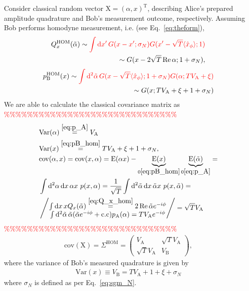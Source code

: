 \documentclass[%
reprint,
superscriptaddress,
 amsmath,amssymb,amsfonts,
 aps,
 pra,
 longbibliography
]{revtex4-2}
\newcommand{\avr}[1]{\ensuremath{\langle{#1}\rangle}}
\renewcommand{\Re}{\mathop{\rm Re}\nolimits}
\newcommand{\ind}[1]{\mathrm{#1}}
\newcommand{\dd}{\mathrm{d}}
\begin{document}
Consider classical random vector $\boldsymbol{\ind{X}}=\left(\alpha, x\right)^{\ind{T}}$, describing Alice's prepared amplitude quadrature and Bob's measurement outcome, respectively.
Assuming Bob performs homodyne measurement, i.e. (see Eq.~\eqref{eq:theform}),
\begin{align}
  \label{eq:Q_x_hom}
  Q_x^{\ind{HOM}}(\tilde{\alpha})\sim\textcolor{red}{\int\mathop{\dd x'} G(x-x';\sigma_N)G(x'-\sqrt T\avr{\hat{x}_\phi};1)}\notag\\\sim G(x-2\sqrt T\Re\alpha; 1+\sigma_N),
\end{align}
\begin{align}
  \label{eq:pB_hom}
  p_{\ind{B}}^{\ind{HOM}}(x)\sim\textcolor{red}{
    \int \mathop{\dd^2\tilde \alpha} G(x-\sqrt T\avr{\hat{x}_\phi}; 1+\sigma_N)G(\alpha;TV_{\ind{A}}+\xi)
  }\notag\\\sim G(x;TV_{\ind{A}}+\xi+1+\sigma_N)
\end{align}
We are able to calculate the classical covariance matrix as
\textcolor{red}{\%\%\%\%\%\%\%\%\%\%\%\%\%\%\%\%\%\%\%\%\%\%\%\%\%\%\%\%\%\%}
\begin{align}
  &\ind{Var}(\alpha)\overset{\eqref{eq:p_A}}{=}V_{\ind{A}}\\
  &\ind{Var}(x)\overset{\eqref{eq:pB_hom}}{=} TV_{\ind{A}}+\xi+1+\sigma_N,\\
  &\ind{cov}(\alpha,x)=\ind{cov}(x,\alpha)=\ind{E}(\alpha x)- \underbrace{\ind{E}(x)}_{0\eqref{eq:pB_hom}}\underbrace{\ind{E}(\tilde\alpha)}_{0\eqref{eq:p_A}}=\notag\\
  &\int\mathop{\dd^2\alpha}\mathop{\dd x}\alpha x\ p(x,\alpha)=
  \frac{1}{\sqrt{T}}\int\mathop{\dd^2\tilde\alpha}\mathop{\dd x}\tilde\alpha x\ p(x,\tilde\alpha)=\notag\\
  &\left/
  \begin{matrix}
    \int \mathop{\dd x} xQ_x(\tilde\alpha)\overset{\eqref{eq:Q_x_hom}}{=}2\Re \tilde \alpha e^{-i\phi}\\
    \int\mathop{\dd^2\tilde\alpha}\tilde\alpha(\tilde \alpha e^{-i\phi}+
    \ind{c.c})p_{\ind{A}}(\alpha)=TV_{\ind{A}}e^{-i\phi}
  \end{matrix}
  \right/=\sqrt{T}V_{\ind{A}}
\end{align}
\textcolor{red}{\%\%\%\%\%\%\%\%\%\%\%\%\%\%\%\%\%\%\%\%\%\%\%\%\%\%\%\%\%\%}
\begin{align}
  \label{eq:S_qp_hom}
    \ind{cov}\left(\boldsymbol{\ind{X}}\right)=\Sigma^{\ind{HOM}}=\begin{pmatrix}
        V_{\ind{A}}&\sqrt TV_{\ind{A}}\\
        \sqrt TV_{\ind{A}}&V_{\ind{B}}
    \end{pmatrix},
\end{align}
where the variance of Bob’s measured quadrature is given by
\begin{align}
  \label{eq:vb}
  \ind{Var}(x)\equiv V_{\ind{B}} = TV_{\ind{A}}+1+\xi+\sigma_N%
\end{align}
where $\sigma_N$ is defined as per Eq.~\eqref{eq:sgm_N}. %
\end{document}
